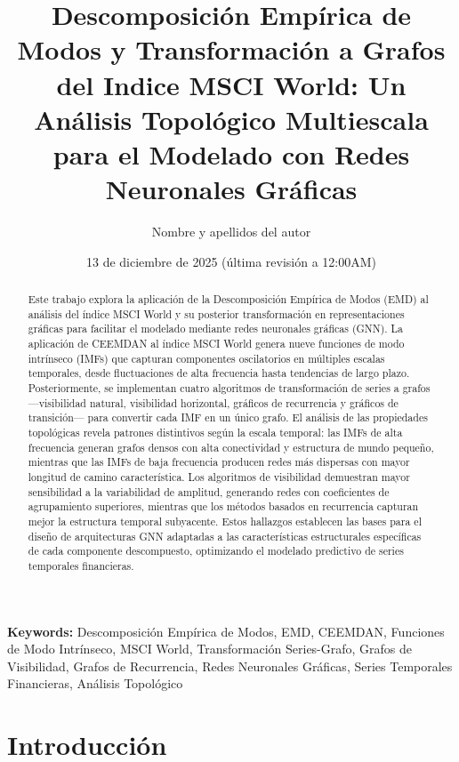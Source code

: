 \documentclass[11pt,a4paper]{article}
\title{Descomposición Empírica de Modos y Transformación a Grafos del Indice MSCI World: Un Análisis Topológico Multiescala para el Modelado con Redes Neuronales Gráficas}
\author{Nombre y apellidos del autor}
\date{13 de diciembre de 2025 (última revisión a 12:00AM)}
\begin{document}
\maketitle

\begin{abstract}
Este trabajo explora la aplicación de la Descomposición Empírica de Modos (EMD) al análisis del índice MSCI World y su posterior transformación en representaciones gráficas para facilitar el modelado mediante redes neuronales gráficas (GNN). La aplicación de CEEMDAN al índice MSCI World genera nueve funciones de modo intrínseco (IMFs) que capturan componentes oscilatorios en múltiples escalas temporales, desde fluctuaciones de alta frecuencia hasta tendencias de largo plazo. Posteriormente, se implementan cuatro algoritmos de transformación de series a grafos —visibilidad natural, visibilidad horizontal, gráficos de recurrencia y gráficos de transición— para convertir cada IMF en un único grafo. El análisis de las propiedades topológicas revela patrones distintivos según la escala temporal: las IMFs de alta frecuencia generan grafos densos con alta conectividad y estructura de mundo pequeño, mientras que las IMFs de baja frecuencia producen redes más dispersas con mayor longitud de camino característica. Los algoritmos de visibilidad demuestran mayor sensibilidad a la variabilidad de amplitud, generando redes con coeficientes de agrupamiento superiores, mientras que los métodos basados en recurrencia capturan mejor la estructura temporal subyacente. Estos hallazgos establecen las bases para el diseño de arquitecturas GNN adaptadas a las características estructurales específicas de cada componente descompuesto, optimizando el modelado predictivo de series temporales financieras.
\end{abstract}

\vspace{0.5cm}

{\normalfont\normalsize\noindent\textbf{Keywords:} Descomposición Empírica de Modos, EMD, CEEMDAN, Funciones de Modo Intrínseco, MSCI World, Transformación Series-Grafo, Grafos de Visibilidad, Grafos de Recurrencia, Redes Neuronales Gráficas, Series Temporales Financieras, Análisis Topológico}

\newpage
\tableofcontents
\newpage

\section{Introducción}
\end{document}
